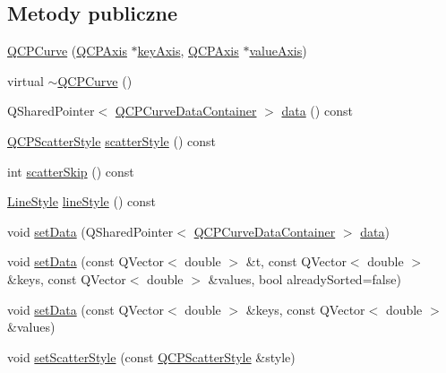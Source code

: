 \subsection*{Metody publiczne}
\begin{DoxyCompactItemize}
\item 
\hyperlink{class_q_c_p_curve_a36de58e2652b3fa47bdf9187d421d3ce}{Q\+C\+P\+Curve} (\hyperlink{class_q_c_p_axis}{Q\+C\+P\+Axis} $\ast$\hyperlink{class_q_c_p_abstract_plottable_a72c7a09c22963f2c943f07112b311103}{key\+Axis}, \hyperlink{class_q_c_p_axis}{Q\+C\+P\+Axis} $\ast$\hyperlink{class_q_c_p_abstract_plottable_a3106f9d34d330a6097a8ec5905e5b519}{value\+Axis})
\item 
virtual \hyperlink{class_q_c_p_curve_a99ee5136754884a220cc0bcacfe419a3}{$\sim$\+Q\+C\+P\+Curve} ()
\item 
Q\+Shared\+Pointer$<$ \hyperlink{qcustomplot_8hh_aaeee80d5664ea91beb9d7968790d0e65}{Q\+C\+P\+Curve\+Data\+Container} $>$ \hyperlink{class_q_c_p_curve_ad89c71fdd1726506c21c0cc471547368}{data} () const 
\item 
\hyperlink{class_q_c_p_scatter_style}{Q\+C\+P\+Scatter\+Style} \hyperlink{class_q_c_p_curve_a9ab864c9f6ba0cedf65853f59d867a68}{scatter\+Style} () const 
\item 
int \hyperlink{class_q_c_p_curve_a3f79b67a8e6bd7d30403d802d39bbcf0}{scatter\+Skip} () const 
\item 
\hyperlink{class_q_c_p_curve_a2710e9f79302152cff794c6e16cc01f1}{Line\+Style} \hyperlink{class_q_c_p_curve_a0314dd644258949aeb4a95cebde5abaf}{line\+Style} () const 
\item 
void \hyperlink{class_q_c_p_curve_a41246850d2e080bc57183ca19cd4135e}{set\+Data} (Q\+Shared\+Pointer$<$ \hyperlink{qcustomplot_8hh_aaeee80d5664ea91beb9d7968790d0e65}{Q\+C\+P\+Curve\+Data\+Container} $>$ \hyperlink{class_q_c_p_curve_ad89c71fdd1726506c21c0cc471547368}{data})
\item 
void \hyperlink{class_q_c_p_curve_a0768af2c33c8dcffa3cf5bdeb53923a6}{set\+Data} (const Q\+Vector$<$ double $>$ \&t, const Q\+Vector$<$ double $>$ \&keys, const Q\+Vector$<$ double $>$ \&values, bool already\+Sorted=false)
\item 
void \hyperlink{class_q_c_p_curve_a9d3245d43304226e013240c94802f7f6}{set\+Data} (const Q\+Vector$<$ double $>$ \&keys, const Q\+Vector$<$ double $>$ \&values)
\item 
void \hyperlink{class_q_c_p_curve_a55e43b44709bf50a35500644988aa706}{set\+Scatter\+Style} (const \hyperlink{class_q_c_p_scatter_style}{Q\+C\+P\+Scatter\+Style} \&style)

\end{DoxyCompactItemize}
